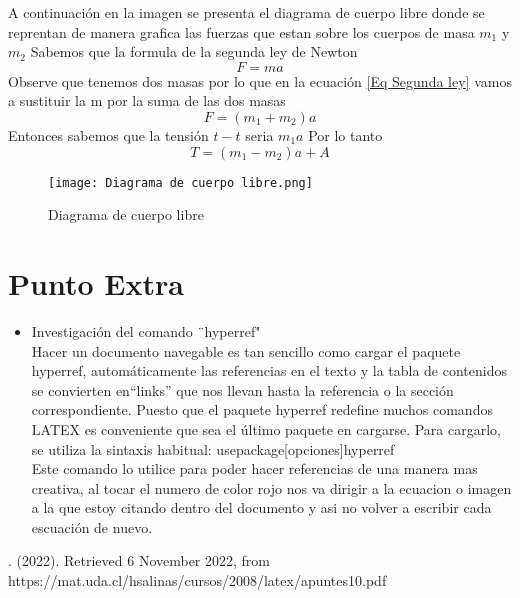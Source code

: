 \documentclass[letterpaper, 12pt]{article}
\begin{document}
\begin{enumerate}
A continuación en la imagen se presenta el diagrama de cuerpo libre donde se reprentan de manera grafica las fuerzas que estan sobre los cuerpos de masa $m_1$ y $m_2$
Sabemos que la formula de la segunda ley de Newton 
\begin{equation}
\label{Eq Segunda ley}
    F = ma
\end{equation}
Observe que tenemos dos masas por lo que en la ecuación \ref{Eq Segunda ley}
vamos a sustituir la m por la suma de las dos masas
\begin{equation}
    F = (m_1 + m_2)a
\end{equation}
Entonces sabemos que la tensión $t - t$ seria $m_1 a$
Por lo tanto 
\begin{equation}
    T = (m_1 -m_2)a + A
\end{equation}

\end{enumerate}
    \begin{figure}
    \centering
        \caption{Diagrama de cuerpo libre }
    \texttt{[image: Diagrama de cuerpo libre.png]}

    \label{fig, diagrama}
\end{figure}

\section{Punto Extra}
\begin{itemize}
    \item Investigación del comando ¨hyperref"\\
    
Hacer un documento navegable es tan sencillo como cargar el paquete hyperref, automáticamente las referencias en el texto y la tabla de contenidos se convierten en“links”
que nos llevan hasta la referencia o la sección correspondiente. Puesto que el paquete
hyperref redefine muchos comandos LATEX es conveniente que sea el último paquete
en cargarse.
Para cargarlo, se utiliza la sintaxis habitual:
usepackage[opciones]{hyperref}\\
Este comando lo utilice para poder hacer referencias de una manera mas creativa, al tocar el numero de color rojo nos va dirigir a la ecuacion o imagen a la que estoy citando dentro del documento y asi no volver a escribir cada escuación de nuevo.
\end{itemize}

\begin{thebibliography}{}
. (2022). Retrieved 6 November 2022, from https://mat.uda.cl/hsalinas/cursos/2008/latex/apuntes10.pdf

\end{thebibliography}
\end{document}
